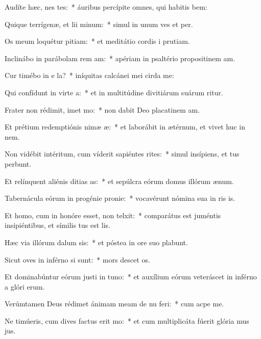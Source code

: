 \item Audíte hæc, nes tes:~* áuribus percípite omnes, qui habitis bem:
\item Quique terrígenæ, et lii minum:~* simul in unum ves et per.
\item Os meum loquétur pitiam:~* et meditátio cordis i prutiam.
\item Inclinábo in parábolam rem am:~* apériam in psaltério propositinem am.
\item Cur timébo in e la?~* iníquitas calcánei mei cirda me:
\item Qui confídunt in virte a:~* et in multitúdine divitiárum suárum ritur.
\item Frater non rédimit, imet mo:~* non dabit Deo placatinem am.
\item Et prétium redemptiónis nimæ æ:~* et laborábit in ætérnum, et vivet huc in nem.
\item Non vidébit intéritum, cum víderit sapiéntes rites:~* simul insípiens, et tus perbunt.
\item Et relínquent aliénis ditias as:~* et sepúlcra eórum domus illórum  ænum.
\item Tabernácula eórum in progénie  pronie:~* vocavérunt nómina sua in ris is.
\item Et homo, cum in honóre esset, non telxit:~* comparátus est juméntis insipiéntibus, et símilis tus est lis.
\item Hæc via illórum dalum sis:~* et póstea in ore suo plabunt.
\item Sicut oves in inférno si sunt:~* mors descet os.
\item Et dominabúntur eórum justi in tuno:~* et auxílium eórum veteráscet in inférno a glóri erum.
\item Verúmtamen Deus rédimet ánimam meam de nu feri:~* cum acpe me.
\item Ne timúeris, cum dives factus erit mo:~* et cum multiplicáta fúerit glória mus jus.
